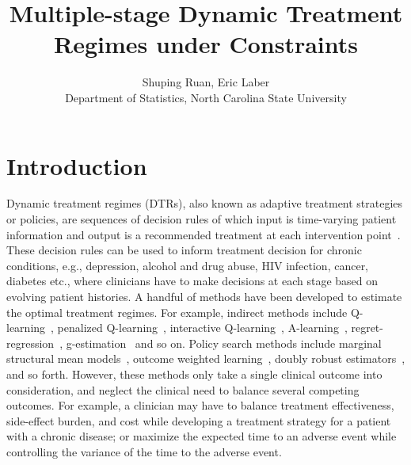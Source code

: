 \documentclass{article}
\title{Multiple-stage Dynamic Treatment Regimes under Constraints}
\author{Shuping Ruan, Eric Laber\\ Department of Statistics, North Carolina State University}
\begin{document}
\maketitle

\section{Introduction}
Dynamic treatment regimes (DTRs), also known as adaptive treatment strategies or policies, are sequences of decision rules of which input is time-varying patient information and output is a recommended treatment at each intervention point~\cite{Chakraborty2014, Moodie2004, Murphy2003}. These decision rules can be used to inform treatment decision for chronic conditions, e.g., depression, alcohol and drug abuse, HIV infection, cancer, diabetes etc., where clinicians have to make decisions at each stage based on evolving patient histories. A handful of methods have been developed to estimate the optimal treatment regimes. For example, indirect methods include Q-learning~\cite{Nahum2012}, penalized Q-learning~\cite{Song2011}, interactive Q-learning~\cite{Linn2014}, A-learning~\cite{Schulte2014}, regret-regression~\cite{henderson2010}, g-estimation~\cite{gestimation} and so on. Policy search methods include marginal structural mean models~\cite{Robins2000,Orellana2010a}, outcome weighted learning~\cite{Zhao2012,Zhang2012,Zhao2015}, doubly robust estimators~\cite{Zhang2012b}, and so forth. However, these methods only take a single clinical outcome into consideration, and neglect the clinical need to balance several competing outcomes. For example, a clinician may have to balance treatment effectiveness, side-effect burden, and cost while developing a treatment strategy for a patient with a chronic disease; or maximize the expected time to an adverse event while controlling the variance of the time to the adverse event.\\
\end{document}
